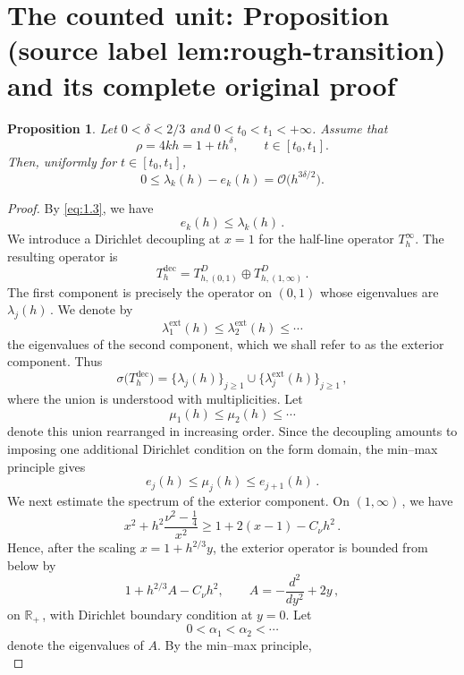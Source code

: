 \documentclass[10pt,a4paper]{amsart}
\theoremstyle{plain}
\newtheorem{proposition}[theorem]{Proposition}
\theoremstyle{remark}
\begin{document}
\section{The counted unit: Proposition (source label lem:rough-transition) and its complete original proof}

\begin{proposition}\label{lem:rough-transition}
Let $0<\delta<2/3$ and $0<t_0<t_1<+\infty$. Assume that
\[
\rho=4kh=1+th^\delta,
\qquad t\in[t_0,t_1].
\]
Then, uniformly for $t\in[t_0,t_1]$,
\[
0\leq \lambda_k(h)-e_k(h)
=\mathcal O\bigl(h^{3\delta/2}\bigr).
\]
\end{proposition}

\begin{proof}
	By \eqref{eq:1.3}, we have
	\begin{equation}\label{eq:rough-lower-bound}
		e_k(h)\leq\lambda_k(h)\,.
	\end{equation}
	We introduce a Dirichlet decoupling at $x=1$ for the half-line
	operator $T_h^\infty$. The resulting operator is
	\[
	T_h^{\mathrm{dec}}
	=
	T_{h,(0,1)}^{D}\oplus T_{h,(1,\infty)}^{D}\,.
	\]
	The first component is precisely the operator on $(0,1)$ whose
	eigenvalues are $\lambda_j(h)\,$. We denote by
	\[
	\lambda_1^{\mathrm{ext}}(h)
	\leq
	\lambda_2^{\mathrm{ext}}(h)
	\leq\cdots
	\]
	the eigenvalues of the second component, which we shall refer to as
	the exterior component. Thus
	\[
	\sigma\bigl(T_h^{\mathrm{dec}}\bigr)
	=
	\{\lambda_j(h)\}_{j\geq1}
	\cup
	\{\lambda_j^{\mathrm{ext}}(h)\}_{j\geq1}\,,
	\]
	where the union is understood with multiplicities. Let
	\[
	\mu_1(h)\leq\mu_2(h)\leq\cdots
	\]
	denote this union rearranged in increasing order. Since the
	decoupling amounts to imposing one additional Dirichlet condition
	on the form domain, the min--max principle gives
	\begin{equation}\label{eq:rough-interlacing}
		e_j(h)\leq\mu_j(h)\leq e_{j+1}(h)\,.
	\end{equation}
	We next estimate the spectrum of the exterior component. On
	$(1,\infty)\,$, we have
	\[
	x^2+h^2\frac{\nu^2-\frac14}{x^2}
	\geq
	1+2(x-1)-C_\nu h^2\,.
	\]
	Hence, after the scaling $x=1+h^{2/3}y$, the exterior operator is
	bounded from below by
	\[
	1+h^{2/3}A-C_\nu h^2,
	\qquad
	A=-\frac{d^2}{dy^2}+2y\,,
	\]
	on $\mathbb R_+\,$, with Dirichlet boundary condition at $y=0$.
	Let
	\[
	0<\alpha_1<\alpha_2<\cdots
	\]
	denote the eigenvalues of $A$. By the min--max principle,
	\begin{equation}\label{eq:rough-exterior-eigenvalue-lower-bound}

\end{equation}
\end{proof}
\end{document}
